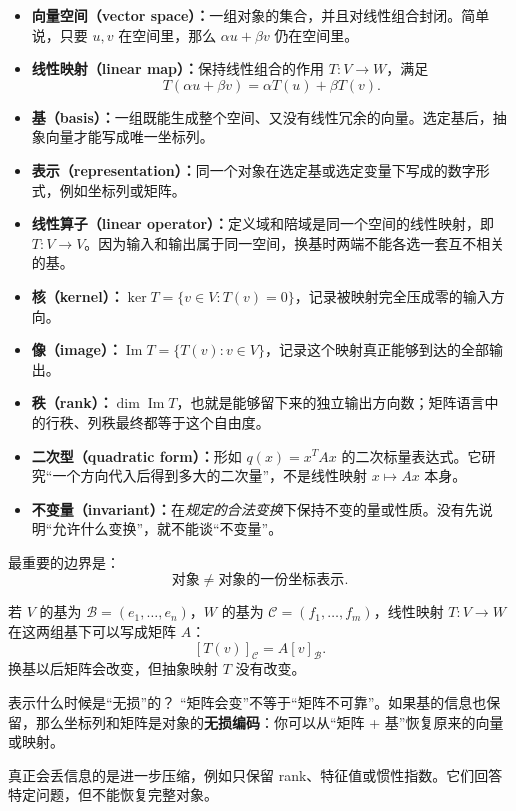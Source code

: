 \documentclass[11pt,a4paper]{ctexart}
\newcommand{\kw}[1]{\textbf{\color{deep}#1}}
\begin{document}
\begin{itemize}
  \item \kw{向量空间（vector space）：}一组对象的集合，并且对线性组合封闭。简单说，只要 $u,v$ 在空间里，那么 $\alpha u+\beta v$ 仍在空间里。
  \item \kw{线性映射（linear map）：}保持线性组合的作用 $T:V\to W$，满足
  \[
  T(\alpha u+\beta v)=\alpha T(u)+\beta T(v).
  \]
  \item \kw{基（basis）：}一组既能生成整个空间、又没有线性冗余的向量。选定基后，抽象向量才能写成唯一坐标列。
  \item \kw{表示（representation）：}同一个对象在选定基或选定变量下写成的数字形式，例如坐标列或矩阵。
  \item \kw{线性算子（linear operator）：}定义域和陪域是同一个空间的线性映射，即 $T:V\to V$。因为输入和输出属于同一空间，换基时两端不能各选一套互不相关的基。
  \item \kw{核（kernel）：}$\ker T=\{v\in V:T(v)=0\}$，记录被映射完全压成零的输入方向。
  \item \kw{像（image）：}$\operatorname{Im}T=\{T(v):v\in V\}$，记录这个映射真正能够到达的全部输出。
  \item \kw{秩（rank）：}$\dim\operatorname{Im}T$，也就是能够留下来的独立输出方向数；矩阵语言中的行秩、列秩最终都等于这个自由度。
  \item \kw{二次型（quadratic form）：}形如 $q(x)=x^TAx$ 的二次标量表达式。它研究“一个方向代入后得到多大的二次量”，不是线性映射 $x\mapsto Ax$ 本身。
  \item \kw{不变量（invariant）：}在\emph{规定的合法变换}下保持不变的量或性质。没有先说明“允许什么变换”，就不能谈“不变量”。
\end{itemize}

最重要的边界是：
\[
\boxed{\text{对象}\neq\text{对象的一份坐标表示}.}
\]

若 $V$ 的基为 $\mathcal B=(e_1,\dots,e_n)$，$W$ 的基为 $\mathcal C=(f_1,\dots,f_m)$，线性映射 $T:V\to W$ 在这两组基下可以写成矩阵 $A$：
\[
[T(v)]_{\mathcal C}=A[v]_{\mathcal B}.
\]
换基以后矩阵会改变，但抽象映射 $T$ 没有改变。

\begin{methodbox}{表示什么时候是“无损”的？}
“矩阵会变”不等于“矩阵不可靠”。如果基的信息也保留，那么坐标列和矩阵是对象的\kw{无损编码}：你可以从“矩阵 + 基”恢复原来的向量或映射。

真正会丢信息的是进一步压缩，例如只保留 rank、特征值或惯性指数。它们回答特定问题，但不能恢复完整对象。
\end{methodbox}
\end{document}
